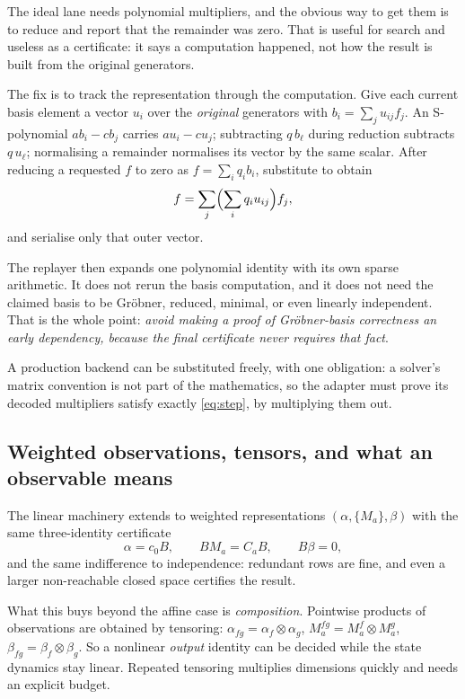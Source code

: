 The ideal lane needs polynomial multipliers, and the obvious way to get them is
to reduce and report that the remainder was zero. That is useful for search and
useless as a certificate: it says a computation happened, not how the result is
built from the original generators.

The fix is to track the representation through the computation. Give each
current basis element a vector $u_i$ over the \emph{original} generators with
$b_i=\sum_j u_{ij}f_j$. An S-polynomial $ab_i-cb_j$ carries $au_i-cu_j$;
subtracting $q\,b_\ell$ during reduction subtracts $q\,u_\ell$; normalising a
remainder normalises its vector by the same scalar. After reducing a requested
$f$ to zero as $f=\sum_i q_ib_i$, substitute to obtain
\[
 f=\sum_j\Bigl(\sum_i q_i u_{ij}\Bigr)f_j ,
\]
and serialise only that outer vector.

The replayer then expands one polynomial identity with its own sparse
arithmetic. It does not rerun the basis computation, and it does not need the
claimed basis to be Gr\"obner, reduced, minimal, or even linearly independent.
That is the whole point: \emph{avoid making a proof of Gr\"obner-basis
correctness an early dependency, because the final certificate never requires
that fact}.

A production backend can be substituted freely, with one obligation: a solver's
matrix convention is not part of the mathematics, so the adapter must prove its
decoded multipliers satisfy exactly \eqref{eq:step}, by multiplying them out.

\subsection{Weighted observations, tensors, and what an observable means}
\label{sec:weighted}

The linear machinery extends to weighted representations
$(\alpha,\{M_a\},\beta)$ with the same three-identity certificate
\[
 \alpha=c_0B,\qquad BM_a=C_aB,\qquad B\beta=0,
\]
and the same indifference to independence: redundant rows are fine, and even a
larger non-reachable closed space certifies the result.

What this buys beyond the affine case is \emph{composition}. Pointwise products
of observations are obtained by tensoring:
$\alpha_{fg}=\alpha_f\otimes\alpha_g$,
$M^{fg}_a=M^f_a\otimes M^g_a$,
$\beta_{fg}=\beta_f\otimes\beta_g$.
So a nonlinear \emph{output} identity can be decided while the state dynamics
stay linear. Repeated tensoring multiplies dimensions quickly and needs an
explicit budget.

